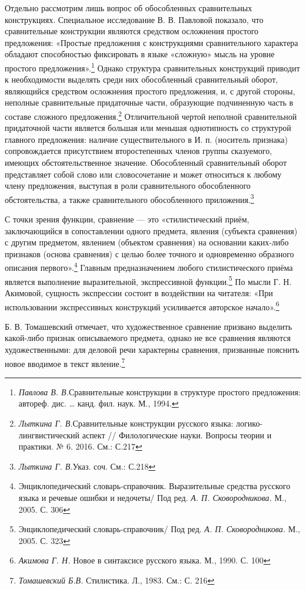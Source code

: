 \documentclass{kursa4}
\begin{document}
{      Отдельно рассмотрим лишь вопрос об обособленных сравнительных конструкциях. Специальное исследование В. В. Павловой показало, что сравнительные конструкции являются средством осложнения простого предложения: «Простые предложения с конструкциями сравнительного характера обладают способностью фиксировать в языке «сложную» мысль на уровне простого предложения».\footnote{\textit{Павлова В. В.}Сравнительные конструкции в структуре простого предложения: автореф. дис. … канд. фил. наук. М., 1994.} Однако структура сравнительных конструкций приводит к необходимости выделять среди них обособленный сравнительный оборот, являющийся средством осложнения простого предложения, и, с другой стороны, неполные сравнительные придаточные части, образующие подчиненную часть в составе сложного предложения.\footnote{\textit{Лыткина Г. В.}Сравнительные конструкции русского языка: логико-лингвистический аспект // Филологические науки. Вопросы теории и практики. № 6. 2016. См.: С.217} Отличительной чертой неполной сравнительной придаточной части является большая или меньшая однотипность со структурой главного предложения: наличие существительного в И. п. (носитель признака) сопровождается присутствием второстепенных членов группы сказуемого, имеющих обстоятельственное значение.  Обособленный сравнительный оборот представляет собой слово или словосочетание и может относиться к любому члену предложения, выступая в роли сравнительного обособленного обстоятельства, а также сравнительного обособленного приложения.\footnote{\textit{Лыткина Г. В.}Указ. соч. См.: С.218} 

      С точки зрения функции, сравнение — это «стилистический приём, заключающийся в сопоставлении одного предмета, явления (субъекта сравнения) с другим предметом, явлением (объектом сравнения) на основании каких-либо признаков (основа сравнения) с целью более точного и одновременно образного описания первого».\footnote{Энциклопедический словарь-справочник. Выразительные средства русского языка и речевые ошибки и недочеты/ Под ред. \textit{А. П. Сковородникова.} М., 2005. С. 306} Главным предназначением любого стилистического приёма является выполнение выразительной, экспрессивной функции.\footnote{Энциклопедический словарь-справочник/ Под ред. \textit{А. П. Сковородникова.} М., 2005. С. 323} По мысли Г. Н. Акимовой, сущность экспрессии  состоит в воздействии на читателя: «При использовании экспрессивных конструкций усиливается авторское начало».\footnote{\textit{Акимова Г. Н.} Новое в синтаксисе русского языка. М., 1990. С. 100} 

      Б. В. Томашевский отмечает, что художественное сравнение призвано выделить какой-либо признак описываемого предмета, однако не все сравнения являются художественными: для деловой речи характерны сравнения, призванные  пояснить новое вводимое в текст явление.\footnote{\textit{Томашевский Б.В.} Стилистика. Л., 1983. См.: С. 216} 

}
\end{document}
